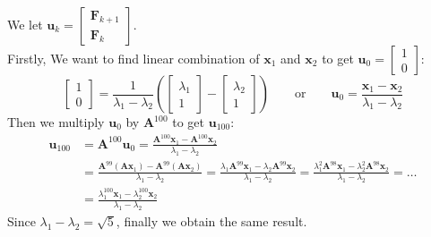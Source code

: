 We let $\bm u_k=\begin{bmatrix}
\bm F_{k+1}\\\bm F_{k}
\end{bmatrix}$.\\
Firstly, We want to find linear combination of $\bm x_1$ and $\bm x_2$ to get $\bm u_0=\begin{bmatrix}
1\\0
\end{bmatrix}$:
\[
\begin{bmatrix}
1\\0
\end{bmatrix}=\frac{1}{\lambda_1-\lambda_2}\left(\begin{bmatrix}
\lambda_1\\1
\end{bmatrix}-\begin{bmatrix}
\lambda_2\\1
\end{bmatrix}\right)\qquad
\text{or}\qquad
\bm u_0=\frac{\bm x_1-\bm x_2}{\lambda_1-\lambda_2}
\]
Then we multiply $\bm u_{0}$ by $\bm A^{100}$ to get $\bm u_{100}$:
\begin{align*}
\bm u_{100}&=\bm A^{100}\bm u_0=\frac{\bm A^{100}\bm x_1-\bm A^{100}\bm x_2}{\lambda_1-\lambda_2}\\
&=\frac{\bm A^{99}(\bm A\bm x_1)-\bm A^{99}(\bm A\bm x_2)}{\lambda_1-\lambda_2}=\frac{\lambda_1\bm A^{99}\bm x_1-\lambda_2\bm A^{99}\bm x_2}{\lambda_1-\lambda_2}=\frac{\lambda_1^2\bm A^{98}\bm x_1-\lambda_2^2\bm A^{98}\bm x_2}{\lambda_1-\lambda_2}=\dots\\
&=\frac{\lambda_1^{100}\bm x_1-\lambda_2^{100}\bm x_2}{\lambda_1-\lambda_2}
\end{align*}
Since $\lambda_1-\lambda_2=\sqrt{5}$, finally we obtain the same result.
